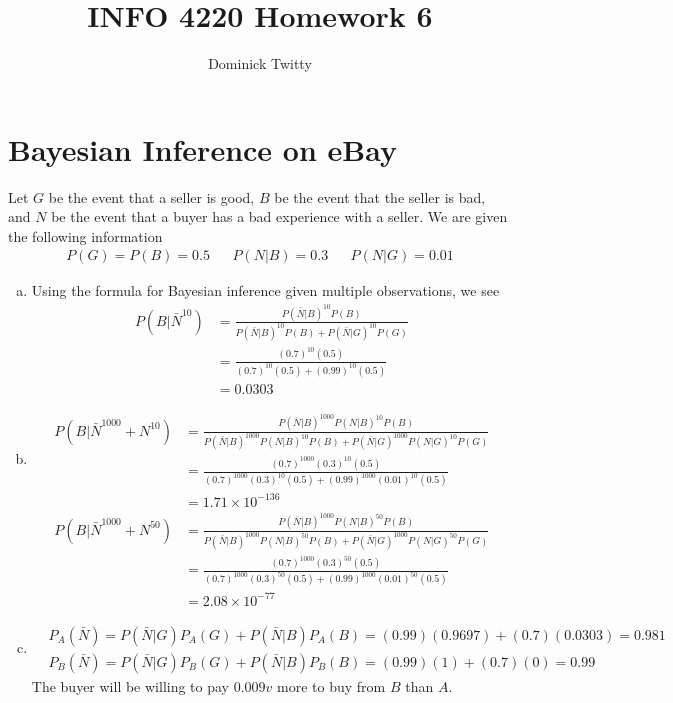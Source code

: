 \documentclass[12pt]{article}
\begin{document}
\title{INFO 4220 Homework 6}
\author{Dominick Twitty}
\date{}
\maketitle

\section{Bayesian Inference on eBay}
Let $G$ be the event that a seller is good, $B$ be the event that the seller is bad, and $N$ be the event that a buyer has a bad experience with a seller. We are given the following information
\begin{align*}
P(G) = P(B) = 0.5 && P(N | B) = 0.3 && P(N | G) = 0.01 
\end{align*}

\begin{enumerate}[(a)]
\item Using the formula for Bayesian inference given multiple observations, we see
\begin{align*}
P(B | \bar N^{10}) &= \frac{P(\bar N | B) ^ {10} P(B)}{P(\bar N | B) ^ {10} P(B) + P(\bar N | G) ^ {10} P(G)}\\
&= \frac{(0.7)^{10} (0.5)}{(0.7)^{10} (0.5) + (0.99)^{10} (0.5)}\\
&= 0.0303
\end{align*}
\item
\begin{align*}
P(B | \bar N^{1000} + N^{10}) &= \frac{P(\bar N | B) ^ {1000} P(N | B)^{10}P(B)}{P(\bar N | B) ^ {1000} P(N | B)^{10}P(B) + P(\bar N | G) ^ {1000} P(N | G)^{10}P(G)}\\
 &= \frac{(0.7)^{1000}(0.3)^{10} (0.5)}{(0.7)^{1000}(0.3)^{10} (0.5) + (0.99)^{1000} (0.01)^{10} (0.5)}\\
&= 1.71 \times 10^{-136}
\end{align*}
\begin{align*}
P(B | \bar N^{1000} + N^{50}) &= \frac{P(\bar N | B) ^ {1000} P(N | B)^{50}P(B)}{P(\bar N | B) ^ {1000} P(N | B)^{50}P(B) + P(\bar N | G) ^ {1000} P(N | G)^{50}P(G)}\\
 &= \frac{(0.7)^{1000}(0.3)^{50} (0.5)}{(0.7)^{1000}(0.3)^{50} (0.5) + (0.99)^{1000} (0.01)^{50} (0.5)}\\
&= 2.08 \times 10^{-77}
\end{align*}

\item 
\begin{align*}
&P_A(\bar N) = P(\bar N | G) P_A(G) + P(\bar N | B) P_A(B) = (0.99)(0.9697) + (0.7)(0.0303) = 0.981\\
&P_B(\bar N) = P(\bar N | G) P_B(G) + P(\bar N | B) P_B(B) = (0.99)(1) + (0.7)(0) = 0.99
\end{align*}
The buyer will be willing to pay $0.009v$ more to buy from $B$ than $A$.

\end{enumerate}
\end{document}
